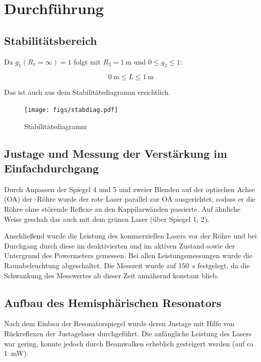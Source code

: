 \documentclass[slug=GL, room=HZDR\ Dresden/Rossendorf\,\ Geb.\ 620/123, supervisor=Tim\ Ziegler]{../../Lab_Report_LaTeX/lab_report}
\begin{document}
\section{Durchf\"uhrung}
\label{sec:durch}

\subsection{Stabilit\"atsbereich}
\label{sec:stabber}

Da \(g_1(R_1=\infty)=1\) folgt mit \(R_2=\SI{1}{\meter}\) und \(0\leq g_2\leq 1\):

\begin{equation}
  \label{eq:stabber}
  \SI{0}{\meter}\leq L \leq \SI{1}{\meter}
\end{equation}

Das ist auch aus dem Stabilit\"atsdiagramm ersichtlich.
\begin{figure}[H]\centering
  \texttt{[image: figs/stabdiag.pdf]}
  \caption[Gauss]{Stabilit\"atsdiagramm}
  \label{fig:stabdiag}
\end{figure}

\subsection{Justage und Messung der Verst\"arkung im Einfachdurchgang}
\label{sec:justage}

Durch Anpassen der Spiegel 4 und 5 und zweier Blenden auf der
optischen Achse (OA) der -R\"ohre wurde der rote Laser
parallel zur OA ausgerichtet, sodass er die R\"ohre ohne st\"orende
Reflexe an den Kappilarw\"anden passierte. Auf \"ahnliche Weise
geschah das auch mit dem gr\"unen Laser (\"uber Spiegel 1, 2).

Anschlie\ss{}end wurde die Leistung des kommerziellen Lasers vor der
R\"ohre und bei Durchgang durch diese im deaktivierten und im aktiven
Zustand sowie der Untergrund des Powermeters gemessen. Bei allen
Leistungsmessungen wurde die Raumbeleuchtung abgeschaltet. Die
Messzeit wurde auf \SI{150}{\second} festgelegt, da die Schwankung
des Messwertes ab dieser Zeit annähernd konstant blieb.

\subsection{Aufbau des Hemisph\"arischen Resonators}
\label{sec:aufbauhemi}

Nach dem Einbau der Resonatorspiegel wurde deren Justage mit Hilfe von
R\"uckreflexen der Justagelaser durchgef\"uhrt. Die anf\"angliche
Leistung des Lasers war gering, konnte jedoch durch Beamwalken
erheblich gesteigert werden (auf ca \SI{1}{\milli\watt}).
\end{document}
